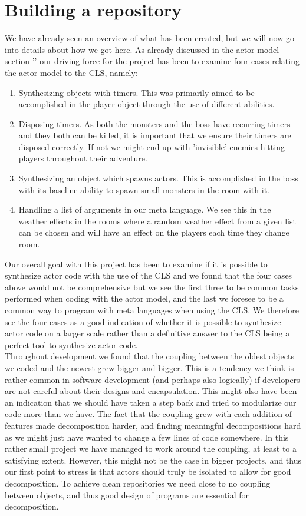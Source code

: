 \section{Building a repository} \label{BuildRep}
We have already seen an overview of what has been created, but we will now go into details about how we got here. As already discussed in the actor model section '' our driving force for the project has been to examine four cases relating the actor model to the CLS, namely:
\begin{enumerate}
	\item Synthesizing objects with timers. This was primarily aimed to be accomplished in the player object through the use of different abilities.
	\item Disposing timers. As both the monsters and the boss have recurring timers and they both can be killed, it is important that we ensure their timers are disposed correctly. If not we might end up with 'invisible' enemies hitting players throughout their adventure.
	\item Synthesizing an object which spawns actors. This is accomplished in the boss with its baseline ability to spawn small monsters in the room with it.
	\item Handling a list of arguments in our meta language. We see this in the weather effects in the rooms where a random weather effect from a given list can be chosen and will have an effect on the players each time they change room.
\end{enumerate}
Our overall goal with this project has been to examine if it is possible to synthesize actor code with the use of the CLS and we found that the four cases above would not be comprehensive but we see the first three to be common tasks performed when coding with the actor model, and the last we foresee to be a common way to program with meta languages when using the CLS. We therefore see the four cases as a good indication of whether it is possible to synthesize actor code on a larger scale rather than a definitive answer to the CLS being a perfect tool to synthesize actor code.\\

Throughout development we found that the coupling between the oldest objects we coded and the newest grew bigger and bigger. This is a tendency we think is rather common in software development (and perhaps also logically) if developers are not careful about their designs and encapsulation. This might also have been an indication that we should have taken a step back and tried to modularize our code more than we have. The fact that the coupling grew with each addition of features made decomposition harder, and finding meaningful decompositions hard as we might just have wanted to change a few lines of code somewhere. In this rather small project we have managed to work around the coupling, at least to a satisfying extent. However, this might not be the case in bigger projects, and thus our first point to stress is that actors should truly be isolated to allow for good decomposition. To achieve clean repositories we need close to no coupling between objects, and thus good design of programs are essential for decomposition. 

